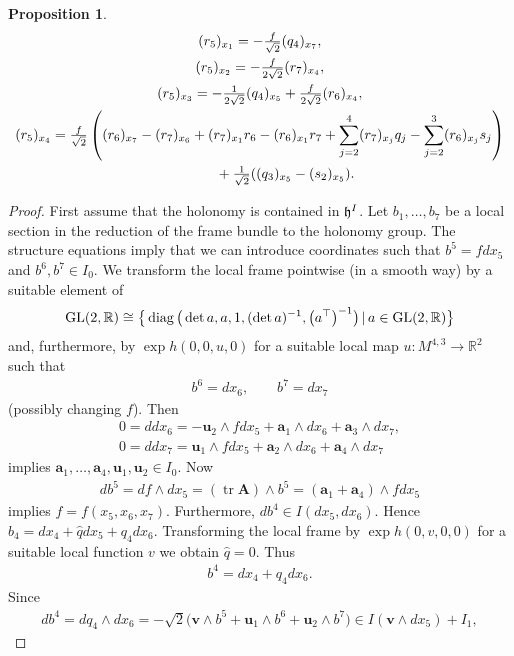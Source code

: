 \documentclass[pdftex]{sigma}
\numberwithin{equation}{section}
\newtheorem{Proposition}[Theorem]{Proposition}
 { \theoremstyle{definition}
\newtheorem{Definition}[Theorem]{Definition}
\newtheorem{Example}[Theorem]{Example}
\newtheorem{Remark}[Theorem]{Remark} }
\newcommand\fh{{\frak h}}
\newcommand\ba{{\mathbf a}}
\newcommand\bA{{\mathbf A}}
\newcommand\bu{{\mathbf u}}
\newcommand\bv{{\mathbf v}}
\newcommand\RR{{\mathbb R}}
\newcommand{\GL}{\mathop{{\rm GL}}}
\newcommand{\tr}{\operatorname{tr}}
\newcommand{\diag}{\operatorname{diag}}
\begin{document}
\begin{Proposition}
\begin{gather}
(r_5)_{x_1}=- \tfrac f{\sqrt 2} (q_4)_{x_7}, \label{Eb6}\\
(r_5)_{x_2}=- \tfrac f{2\sqrt 2} (r_7)_{x_4}, \label{Eb7}\\
(r_5)_{x_3}=- \tfrac1{2\sqrt 2} (q_4)_{x_5}+ \tfrac f{2\sqrt 2} (r_6)_{x_4}, \label{Eb7a}\\
(r_5)_{x_4}= \tfrac f{\sqrt 2} \left( (r_6)_{x_7}-(r_7)_{x_6}+(r_7)_{x_1}r_6-(r_6)_{x_1}r_7+\sum_{j=2}^4 (r_7)_{x_j}q_j-\sum_{j=2}^3 (r_6)_{x_j}s_j\right) \nonumber\\
\hphantom{(r_5)_{x_4}=}{} + \tfrac 1{\sqrt 2} ((q_3)_{x_5}-(s_2)_{x_5}).\label{Eb10}
\end{gather}
\end{Proposition}
\begin{proof}First assume that the holonomy is contained in $\fh^I$. Let $b_1,\dots,b_7$ be a local section in the reduction of the frame bundle to the holonomy group. The structure equations imply that we can introduce coordinates such that $b^5=fdx_5$ and $b^6,b^7\in I_0$. We transform the local frame pointwise (in a smooth way) by a suitable element of \begin{gather*}\GL(2,\RR)\cong \big\{\diag\big(\det a, a,1, (\det a)^{-1}, \big(a^\top\big)^{-1}\big)\,|\, a\in\GL(2,\RR)\big\}\end{gather*} and, furthermore, by $\exp h(0,0,u,0)$ for a suitable local map $u\colon M^{4,3} \rightarrow \RR^2$ such that
\begin{gather*}b^6=dx_6,\qquad b^7=dx_7\end{gather*}
(possibly changing $f$). Then
\begin{gather*}
0 =ddx_6= -\bu_2\wedge fdx_5+\ba_1\wedge dx_6 +\ba_3\wedge dx_7,\\
0 =ddx_7= \bu_1\wedge fdx_5+\ba_2\wedge dx_6 +\ba_4\wedge dx_7
\end{gather*}
implies $\ba_1,\dots,\ba_4,\bu_1, \bu_2\in I_0$. Now
\begin{gather*}db^5=df\wedge dx_5=(\tr \bA)\wedge b^5= (\ba_1+\ba_4)\wedge fdx_5\end{gather*}
implies $f=f(x_5,x_6,x_7)$.
Furthermore, $db^4\in I(dx_5,dx_6)$. Hence $b_4=dx_4+\hat qdx_5+q_4 dx_6$. Transforming the local frame by $\exp h(0,v,0,0)$ for a suitable local function $v$ we obtain $\hat q=0$. Thus
\begin{gather*}b^4=dx_4+q_4 dx_6.\end{gather*}
Since
\begin{gather*} db^4=dq_4\wedge dx_6 =-\sqrt 2\big( \bv\wedge b^5+ \bu_1\wedge b^6 +\bu_2\wedge b^7\big)\in I(\bv\wedge dx_5)+ I_1,\end{gather*}

\end{proof}
\end{document}
